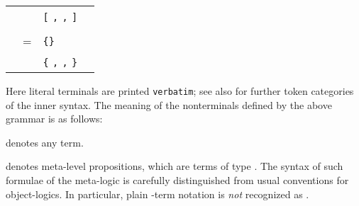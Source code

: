 \begin{isabellebody}
\begin{isamarkuptext}
\begin{center}
\begin{supertabular}{rclr}
    &  & \verb|[|  \verb|,|  \verb|,|  \verb|]|   &  \\\\

  \hypertarget{syntax.inner.sort}{\hyperlink{syntax.inner.sort}{\mbox{}}} & = & \verb|{}| \\
    &  & \verb|{|  \verb|,|  \verb|,|  \verb|}| \\
  \end{supertabular}
  \end{center}

  \medskip Here literal terminals are printed \verb|verbatim|;
  see also  for further token categories of the
  inner syntax.  The meaning of the nonterminals defined by the above
  grammar is as follows:

  \begin{description}

  \item {}\hyperlink{syntax.inner.any}{\mbox{}} denotes any term.

  \item {}\hyperlink{syntax.inner.prop}{\mbox{}} denotes meta-level propositions,
  which are terms of type .  The syntax of such formulae of
  the meta-logic is carefully distinguished from usual conventions for
  object-logics.  In particular, plain -term notation is
  \emph{not} recognized as \hyperlink{syntax.inner.prop}{\mbox{}}.


\end{description}
\end{isamarkuptext}
\end{isabellebody}
